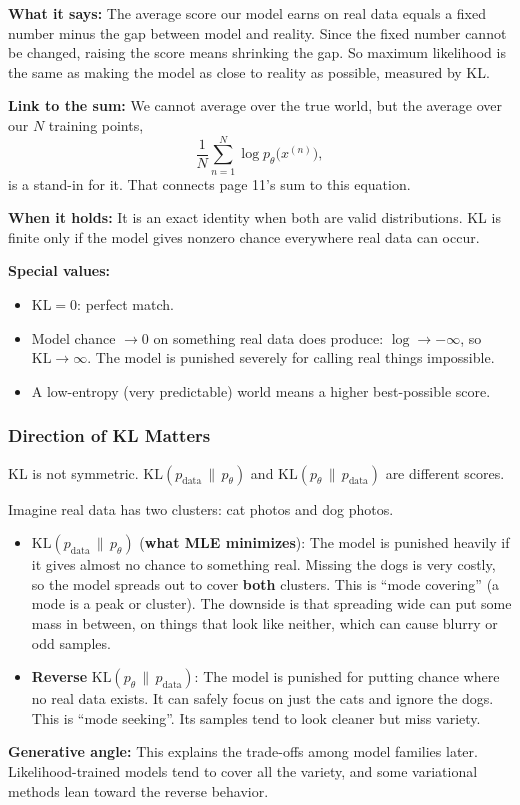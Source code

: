 \textbf{What it says:} The average score our model earns on real data equals a fixed number minus the gap between model and reality. Since the fixed number cannot be changed, raising the score means shrinking the gap. So maximum likelihood is the same as making the model as close to reality as possible, measured by KL.

\textbf{Link to the sum:} We cannot average over the true world, but the average over our $N$ training points,
\[
\frac{1}{N} \sum_{n=1}^{N} \log p_{\theta}\bigl(x^{(n)}\bigr),
\]
is a stand-in for it. That connects page 11's sum to this equation.

\textbf{When it holds:} It is an exact identity when both are valid distributions. KL is finite only if the model gives nonzero chance everywhere real data can occur.

\textbf{Special values:}
\begin{itemize}
  \item $\mathrm{KL} = 0$: perfect match.
  \item Model chance $\to 0$ on something real data does produce: $\log \to -\infty$, so $\mathrm{KL} \to \infty$. The model is punished severely for calling real things impossible.
  \item A low-entropy (very predictable) world means a higher best-possible score.
\end{itemize}

\subsubsection*{Direction of KL Matters}

KL is not symmetric. $\mathrm{KL}(p_{\mathrm{data}} \,\|\, p_{\theta})$ and $\mathrm{KL}(p_{\theta} \,\|\, p_{\mathrm{data}})$ are different scores.

Imagine real data has two clusters: cat photos and dog photos.

\begin{itemize}
  \item $\mathrm{KL}(p_{\mathrm{data}} \,\|\, p_{\theta})$ (\textbf{what MLE minimizes}): The model is punished heavily if it gives almost no chance to something real. Missing the dogs is very costly, so the model spreads out to cover \textbf{both} clusters. This is ``mode covering'' (a mode is a peak or cluster). The downside is that spreading wide can put some mass in between, on things that look like neither, which can cause blurry or odd samples.
  \item \textbf{Reverse} $\mathrm{KL}(p_{\theta} \,\|\, p_{\mathrm{data}})$: The model is punished for putting chance where no real data exists. It can safely focus on just the cats and ignore the dogs. This is ``mode seeking''. Its samples tend to look cleaner but miss variety.
\end{itemize}

\textbf{Generative angle:} This explains the trade-offs among model families later. Likelihood-trained models tend to cover all the variety, and some variational methods lean toward the reverse behavior.